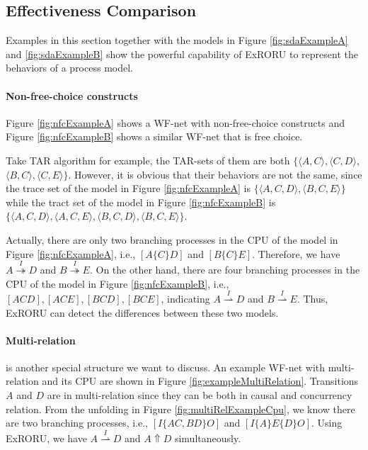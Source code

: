 \documentclass{llncs}
\begin{document}
\subsection{Effectiveness Comparison}\label{subsec:effectiveness}
Examples in this section together with the models in Figure \ref{fig:sdaExampleA} and \ref{fig:sdaExampleB} show the powerful capability of ExRORU to represent the behaviors of a process model.

\paragraph{Non-free-choice constructs}\label{par:nfc} 
Figure \ref{fig:nfcExampleA} shows a WF-net with non-free-choice constructs \cite{de2003workflow} and Figure \ref{fig:nfcExampleB} shows a similar WF-net that is free choice.

Take TAR algorithm for example, the TAR-sets of them are both $\{\langle A,C\rangle, \langle C,D\rangle$, $\langle B,C\rangle, \langle C,E\rangle\}$. However, it is obvious that their behaviors are not the same, since the trace set of the model in Figure \ref{fig:nfcExampleA} is $\{\langle A,C,D\rangle,\langle B,C,E\rangle\}$ while the tract set of the model in Figure \ref{fig:nfcExampleB} is $\{\langle A,C,D\rangle,\langle A,C,E\rangle,\langle B,C,D\rangle,\langle B,C,E\rangle\}$.

Actually, there are only two branching processes in the CPU of the model in Figure \ref{fig:nfcExampleA}, i.e., $[A\{C\}D]$ and $[B\{C\}E]$. Therefore, we have $A\overset{I}{\twoheadrightarrow}D$ and $B\overset{I}{\twoheadrightarrow}E$. On the other hand, there are four branching processes in the CPU of the model in Figure \ref{fig:nfcExampleB}, i.e., $[ACD],[ACE],[BCD],[BCE]$, indicating $A\overset{I}{\rightharpoonup}D$ and $B\overset{I}{\rightharpoonup}E$. Thus, ExRORU can detect the differences between these two models.

\paragraph{Multi-relation} is another special structure we want to discuss. An example WF-net with multi-relation and its CPU are shown in Figure \ref{fig:exampleMultiRelation}. Transitions $A$ and $D$ are in multi-relation since they can be both in causal and concurrency relation. From the unfolding in Figure \ref{fig:multiRelExampleCpu}, we know there are two branching processes, i.e., $[I\{AC,BD\}O]$ and $[I\{A\}E\{D\}O]$. Using ExRORU, we have $A\overset{I}{\rightharpoonup}D$ and $A\Uparrow D$ simultaneously.
\end{document}
